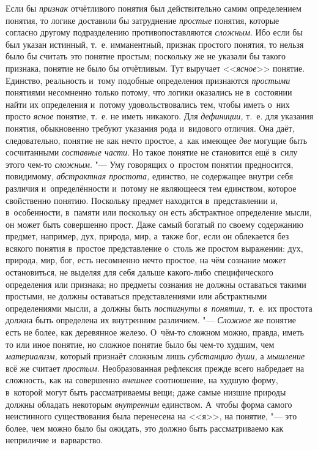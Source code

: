 Если бы {\em признак} отчётливого понятия был действительно самим определением
понятия, то логике доставили бы затруднение {\em простые} понятия,
которые согласно другому подразделению противопоставляются {\em сложным}. Ибо
если бы был указан истинный, т.~е. имманентный, признак простого понятия, то
нельзя было бы считать это понятие простым; поскольку же не указали бы
такого признака, понятие не было бы отчётливым. Тут выручает <<{\em ясное}>>
понятие. Единство, реальность и~тому подобные определения признаются
{\em простыми} понятиями несомненно только потому, что логики оказались не
в~состоянии найти их определения и~потому удовольствовались тем, чтобы иметь
о~них просто {\em ясное} понятие, т.~е. не иметь никакого. Для {\em дефиниции,}
т.~е. для указания понятия, обыкновенно требуют указания рода и~видового
отличия. Она даёт, следовательно, понятие не как нечто простое, а~как имеющее
{\em две} могущие быть сосчитанными {\em составные части}. Но такое понятие
не становится ещё в~силу этого чем-то {\em сложным}. "--- Уму говорящих
о~простом понятии предносится, повидимому, {\em абстрактная простота,}
единство, не содержащее внутри себя различия и~определённости
и~потому не являющееся тем единством, которое свойственно понятию.
Поскольку предмет находится в~представлении и, в~особенности, в~памяти или
поскольку он есть абстрактное определение мысли, он может быть совершенно
прост. Даже самый богатый по своему содержанию предмет, например, дух,
природа, мир, а~также бог, если он облекается без всякого понятия в~простое
представление о~столь же простом выражении: дух, природа, мир, бог, есть
несомненно нечто простое, на чём сознание может остановиться, не выделяя
для себя дальше какого-либо специфического определения или признака; но
предметы сознания не должны оставаться такими простыми, не должны
оставаться представлениями или абстрактными определениями мысли, а~должны
быть {\em постигнуты в~понятии,} т.~е. их простота должна быть определена их
внутренним различием. "--- {\em Сложное} же понятие есть не более, как
деревянное железо. О~чём-то сложном можно, правда, иметь то или иное понятие,
но сложное понятие было бы чем-то худшим, чем {\em материализм,} который
признаёт сложным лишь {\em субстанцию души,} а {\em мышление} всё же считает
{\em простым}. Необразованная рефлексия прежде всего набредает на сложность,
как на совершенно {\em внешнее} соотношение, на худшую форму, в~которой могут
быть рассматриваемы вещи; даже самые низшие природы должны обладать некоторым
{\em внутренним} единством. А~чтобы форма самого неистинного существования была
перенесена на <<я>>, на понятие, "--- это более, чем можно было бы ожидать, это
должно быть рассматриваемо как неприличие и~варварство.

